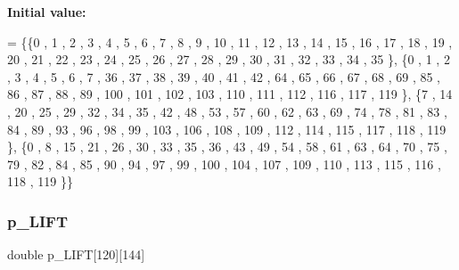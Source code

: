 {\bfseries Initial value\+:}
\begin{DoxyCode}
= \{\{0 , 1 , 2 , 3 , 4 , 5 , 6 , 7 , 8 , 9 , 10 , 11 , 12 , 13 , 14 , 15 , 16 , 17 , 18 , 19 , 20 , 21 , 22 
      , 23 , 24 , 25 , 26 , 27 , 28 , 29 , 30 , 31 , 32 , 33 , 34 , 35 \},
\{0 , 1 , 2 , 3 , 4 , 5 , 6 , 7 , 36 , 37 , 38 , 39 , 40 , 41 , 42 , 64 , 65 , 66 , 67 , 68 , 69 , 85 , 86 ,
       87 , 88 , 89 , 100 , 101 , 102 , 103 , 110 , 111 , 112 , 116 , 117 , 119 \},
\{7 , 14 , 20 , 25 , 29 , 32 , 34 , 35 , 42 , 48 , 53 , 57 , 60 , 62 , 63 , 69 , 74 , 78 , 81 , 83 , 84 , 89
       , 93 , 96 , 98 , 99 , 103 , 106 , 108 , 109 , 112 , 114 , 115 , 117 , 118 , 119 \},
\{0 , 8 , 15 , 21 , 26 , 30 , 33 , 35 , 36 , 43 , 49 , 54 , 58 , 61 , 63 , 64 , 70 , 75 , 79 , 82 , 84 , 85 
      , 90 , 94 , 97 , 99 , 100 , 104 , 107 , 109 , 110 , 113 , 115 , 116 , 118 , 119 \}\}
\end{DoxyCode}
\mbox{\label{a00497_aa7ed29789dbb7c9ad2d50ef047799aff}} 
\subsubsection{\texorpdfstring{p\+\_\+\+L\+I\+FT}{p\_LIFT}}
{\footnotesize\ttfamily double p\+\_\+\+L\+I\+FT\mbox{[}120\mbox{]}\mbox{[}144\mbox{]}}

\mbox{\label{a00497_a93664994bfca0598d5acb1878413f1c7}} 
